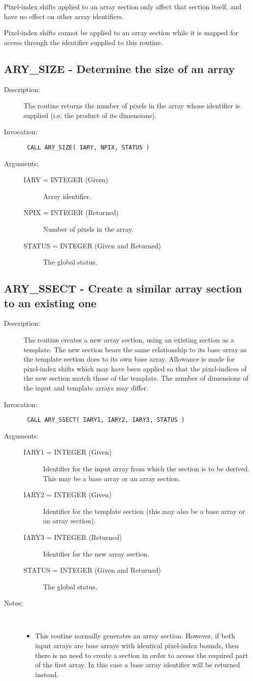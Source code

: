 \documentclass[twoside,11pt]{article}
\newcommand{\xlabel}[1]{}
\newlength{\sstbannerlength}
\newlength{\sstcaptionlength}
\newlength{\sstexampleslength}
\newlength{\sstexampleswidth}
\newcommand{\sstroutine}[3]{
   \goodbreak
   \rule{\textwidth}{0.5mm}
   \vspace{-7ex}
   \newline
   \settowidth{\sstbannerlength}{{\Large {\bf #1}}}
   \setlength{\sstcaptionlength}{\textwidth}
   \setlength{\sstexampleslength}{\textwidth}
   \addtolength{\sstbannerlength}{0.5em}
   \addtolength{\sstcaptionlength}{-2.0\sstbannerlength}
   \addtolength{\sstcaptionlength}{-5.0pt}
   \settowidth{\sstexampleswidth}{{\bf Examples:}}
   \addtolength{\sstexampleslength}{-\sstexampleswidth}
   \parbox[t]{\sstbannerlength}{\flushleft{\Large {\bf #1}}}
   \parbox[t]{\sstcaptionlength}{\center{\Large #2}}
   \parbox[t]{\sstbannerlength}{\flushright{\Large {\bf #1}}}
   \begin{description}
      #3
   \end{description}
}
\newcommand{\sstdescription}[1]{\item[Description:] #1}
\newcommand{\sstinvocation}[1]{\item[Invocation:]\hspace{0.4em}{\tt #1}}
\newcommand{\sstarguments}[1]{
   \item[Arguments:] \mbox{} \\
   \vspace{-3.5ex}
   \begin{description}
      #1
   \end{description}
}
\newcommand{\sstsubsection}[1]{ \item[{#1}] \mbox{} \\}
\newcommand{\sstnotes}[1]{\item[Notes:] \mbox{} \\[1.3ex] #1}
\newcommand{\sstitemlist}[1]{
  \mbox{} \\
  \vspace{-3.5ex}
  \begin{itemize}
     #1
  \end{itemize}
}
\newcommand{\sstitem}{\item}
\newcommand{\ssttt}{\tt}
\renewcommand{\sstroutine}[3]{
      \subsection{#1\xlabel{#1}-\label{#1}#2}
      \begin{description}
         #3
      \end{description}
   }
\renewcommand{\sstdescription}[1]{\item[Description:]
      \begin{description}
         #1
      \end{description}
   }
\renewcommand{\sstinvocation}[1]{\item[Invocation:]
      \begin{description}
         {\ssttt #1}
      \end{description}
   }
\renewcommand{\sstarguments}[1]{
      \item[Arguments:]
      \begin{description}
         #1
      \end{description}
   }
\renewcommand{\sstsubsection}[1]{\item[{#1}]}
\renewcommand{\sstnotes}[1]{\item[Notes:]
      \begin{description}
         #1
      \end{description}
   }
\newcommand{\sstitemlist}[1]{
      \begin{itemize}
         #1
      \end{itemize}
   }
\begin{document}
\begin{eqn*}
{{{         \sstitem
         Pixel-index shifts applied to an array section only affect
         that section itself, and have no effect on other array
         identifiers.

         \sstitem
         Pixel-index shifts cannot be applied to an array section while
         it is mapped for access through the identifier supplied to this
         routine.
      }
   }
}
\sstroutine{
   ARY\_SIZE
}{
   Determine the size of an array
}{
   \sstdescription{
      The routine returns the number of pixels in the array whose
      identifier is supplied (i.e. the product of its dimensions).
   }
   \sstinvocation{
      CALL ARY\_SIZE( IARY, NPIX, STATUS )
   }
   \sstarguments{
      \sstsubsection{
         IARY = INTEGER (Given)
      }{
         Array identifier.
      }
      \sstsubsection{
         NPIX = INTEGER (Returned)
      }{
         Number of pixels in the array.
      }
      \sstsubsection{
         STATUS = INTEGER (Given and Returned)
      }{
         The global status.
      }
   }
}
\sstroutine{
   ARY\_SSECT
}{
   Create a similar array section to an existing one
}{
   \sstdescription{
      The routine creates a new array section, using an existing
      section as a template. The new section bears the same
      relationship to its base array as the template section does to
      its own base array. Allowance is made for pixel-index shifts
      which may have been applied so that the pixel-indices of the new
      section match those of the template.  The number of dimensions of
      the input and template arrays may differ.
   }
   \sstinvocation{
      CALL ARY\_SSECT( IARY1, IARY2, IARY3, STATUS )
   }
   \sstarguments{
      \sstsubsection{
         IARY1 = INTEGER (Given)
      }{
         Identifier for the input array from which the section is to be
         derived. This may be a base array or an array section.
      }
      \sstsubsection{
         IARY2 = INTEGER (Given)
      }{
         Identifier for the template section (this may also be a base
         array or an array section).
      }
      \sstsubsection{
         IARY3 = INTEGER (Returned)
      }{
         Identifier for the new array section.
      }
      \sstsubsection{
         STATUS = INTEGER (Given and Returned)
      }{
         The global status.
      }
   }
   \sstnotes{
      \sstitemlist{

         \sstitem
         This routine normally generates an array section.  However, if
         both input arrays are base arrays with identical pixel-index
         bounds, then there is no need to create a section in order to
         access the required part of the first array. In this case a base
         array identifier will be returned instead.

}}}
\end{eqn*}
\end{document}
